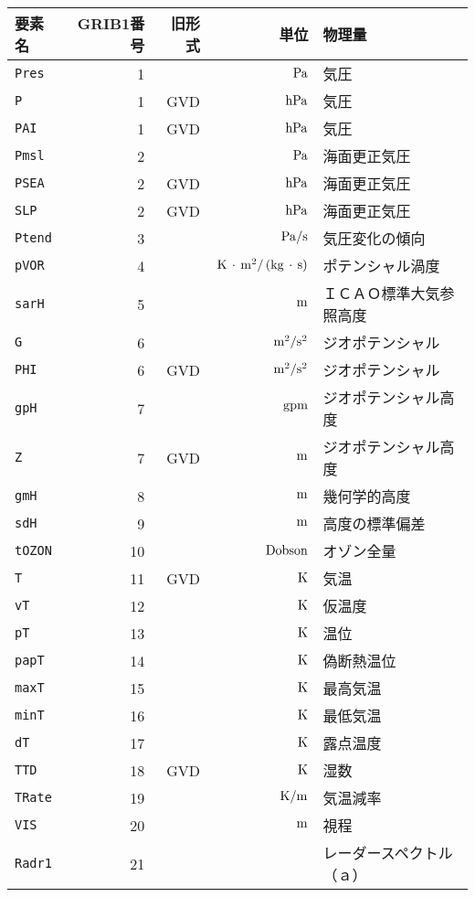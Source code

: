 \begin{longtable}{l|rrrp{}}
\hline
要素名 & GRIB1番号 & 旧形式 & 単位 & 物理量 \\
\hline
{\tt Pres} & 1 &  & ${\rm\,Pa}$ & 気圧 \\
{\tt P} & 1 & GVD & ${\rm\,hPa}$ & 気圧 \\
{\tt PAI} & 1 & GVD & ${\rm\,hPa}$ & 気圧 \\
{\tt Pmsl} & 2 &  & ${\rm\,Pa}$ & 海面更正気圧 \\
{\tt PSEA} & 2 & GVD & ${\rm\,hPa}$ & 海面更正気圧 \\
{\tt SLP} & 2 & GVD & ${\rm\,hPa}$ & 海面更正気圧 \\
{\tt Ptend} & 3 &  & ${\rm\,Pa/s}$ & 気圧変化の傾向 \\
{\tt pVOR} & 4 &  & ${\rm\,K\,\cdot\,m^2/\,(kg\,\cdot\,s)}$ & ポテンシャル渦度 \\
{\tt sarH} & 5 &  & ${\rm\,m}$ & ＩＣＡＯ標準大気参照高度 \\
{\tt G} & 6 &  & ${\rm\,m^2/s^2}$ & ジオポテンシャル \\
{\tt PHI} & 6 & GVD & ${\rm\,m^2/s^2}$ & ジオポテンシャル \\
{\tt gpH} & 7 &  & ${\rm\,gpm}$ & ジオポテンシャル高度 \\
{\tt Z} & 7 & GVD & ${\rm\,m}$ & ジオポテンシャル高度 \\
{\tt gmH} & 8 &  & ${\rm\,m}$ & 幾何学的高度 \\
{\tt sdH} & 9 &  & ${\rm\,m}$ & 高度の標準偏差 \\
{\tt tOZON} & 10 &  & ${\rm\,Dobson}$ & オゾン全量 \\
{\tt T} & 11 & GVD & ${\rm\,K}$ & 気温 \\
{\tt vT} & 12 &  & ${\rm\,K}$ & 仮温度 \\
{\tt pT} & 13 &  & ${\rm\,K}$ & 温位 \\
{\tt papT} & 14 &  & ${\rm\,K}$ & 偽断熱温位 \\
{\tt maxT} & 15 &  & ${\rm\,K}$ & 最高気温 \\
{\tt minT} & 16 &  & ${\rm\,K}$ & 最低気温 \\
{\tt dT} & 17 &  & ${\rm\,K}$ & 露点温度 \\
{\tt TTD} & 18 & GVD & ${\rm\,K}$ & 湿数 \\
{\tt TRate} & 19 &  & ${\rm\,K/m}$ & 気温減率 \\
{\tt VIS} & 20 &  & ${\rm\,m}$ & 視程 \\
{\tt Radr1} & 21 &  &  & レーダースペクトル（ａ） \\

\end{longtable}
